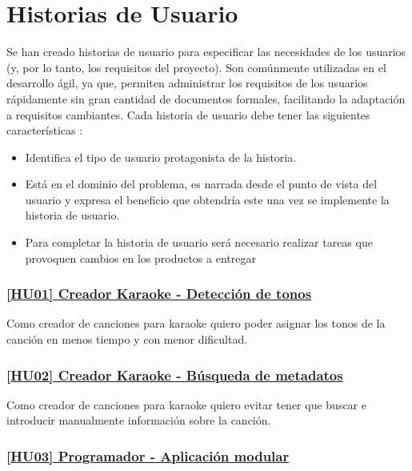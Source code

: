 \section{Historias de Usuario}

Se han creado historias de usuario para especificar las necesidades de los usuarios (y, por lo tanto, los requisitos del proyecto). Son comúnmente utilizadas en el desarrollo ágil, ya que, permiten administrar los requisitos de los usuarios rápidamente sin gran cantidad de documentos formales, facilitando la adaptación a requisitos cambiantes. Cada historia de usuario debe tener las siguientes características \cite{hujj}:

\begin{itemize}
	\item{Identifica el tipo de usuario protagonista de la historia.}
	\item{Está en el dominio del problema, es narrada desde el punto de vista del usuario y expresa el beneficio que obtendría este una vez se implemente la historia de usuario.}
	\item{Para completar la historia de usuario será necesario realizar tareas que provoquen cambios en los productos a entregar}
\end{itemize}


\subsubsection*{\href{https://github.com/dipzza/ultrastar-song2txt/issues/7}{[HU01] Creador Karaoke - Detección de tonos}}

Como creador de canciones para karaoke quiero poder asignar los tonos de la canción en menos tiempo y con menor dificultad.

\subsubsection*{\href{https://github.com/dipzza/ultrastar-song2txt/issues/8}{[HU02] Creador Karaoke - Búsqueda de metadatos}}

Como creador de canciones para karaoke quiero evitar tener que buscar e introducir manualmente información sobre la canción.


\subsubsection*{\href{https://github.com/dipzza/ultrastar-song2txt/issues/10}{[HU03] Programador - Aplicación modular}}


